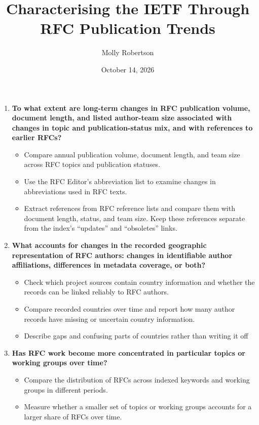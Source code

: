 \documentclass{l4proj}
\begin{document}
\title{Characterising the IETF Through RFC Publication Trends}
\author{Molly Robertson}
\date{October 14, 2026}

\maketitle

\begin{highlight}
\begin{enumerate}
    \item \textbf{To what extent are long-term changes in RFC publication volume, document length, and listed author-team size associated with changes in topic and publication-status mix, and with references to earlier RFCs?}
    \begin{itemize}
        \item Compare annual publication volume, document length, and team size across RFC topics and publication statuses.
        \item Use the RFC Editor's abbreviation list to examine changes in abbreviations used in RFC texts.
        \item Extract references from RFC reference lists and compare them with document length, status, and team size. Keep these references separate from the index's ``updates'' and ``obsoletes'' links.
    \end{itemize}

    \item \textbf{What accounts for changes in the recorded geographic representation of RFC authors: changes in identifiable author affiliations, differences in metadata coverage, or both?}
    \begin{itemize}
        \item Check which project sources contain country information and whether the records can be linked reliably to RFC authors.
        \item Compare recorded countries over time and report how many author records have missing or uncertain country information.
        \item Describe gaps and confusing parts of countries rather than writing it off
    \end{itemize}

    \item \textbf{Has RFC work become more concentrated in particular topics or working groups over time?}
    \begin{itemize}
        \item Compare the distribution of RFCs across indexed keywords and working groups in different periods.
        \item Measure whether a smaller set of topics or working groups accounts for a larger share of RFCs over time.
    \end{itemize}
\end{enumerate}


\end{highlight}
\end{document}
